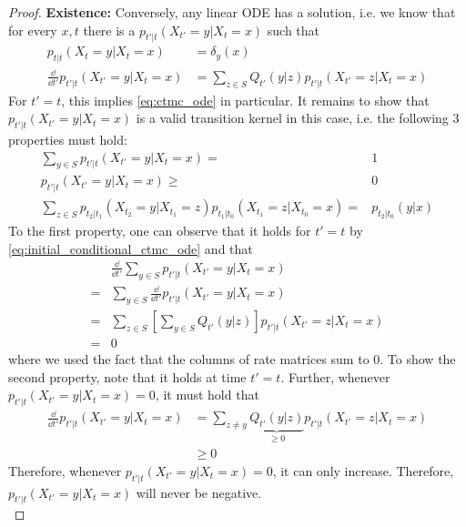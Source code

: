 \begin{proof}
\textbf{Existence: }Conversely, any linear ODE has a solution, i.e. we know that for every $x,t$ there is a $p_{t'|t}(X_{t'}=y|X_{t}=x)$ such that 
\begin{align}
\label{eq:initial_conditional_ctmc_ode}
    p_{t|t}(X_{t}=y|X_{t}=x)&=\delta_{y}(x)\\
\frac{\dd}{\dd t'}p_{t'|t}(X_{t'}=y|X_{t}=x)&=\sum\limits_{z\in S}Q_{t'}(y|z)p_{t'|t}(X_{t'}=z|X_t=x)
\end{align}
For $t'=t$, this implies \cref{eq:ctmc_ode} in particular. It remains to show that $p_{t'|t}(X_{t'}=y|X_{t}=x)$ is a valid transition kernel in this case, i.e. the following 3 properties must hold:
\begin{align}
    \sum\limits_{y\in S}p_{t'|t}(X_{t'}=y|X_{t}=x)=&1\\
    p_{t'|t}(X_{t'}=y|X_{t}=x)\geq& 0\\
    \sum\limits_{z\in S}p_{t_{2}|t_{1}}(X_{t_2}=y|X_{t_1}=z)p_{t_1|t_0}(X_{t_1}=z|X_{t_0}=x)=&p_{t_2|t_0}(y|x)
\end{align}
To the first property, one can observe that it holds for $t'=t$ by \cref{eq:initial_conditional_ctmc_ode} and that 
\begin{align}
&\frac{\dd}{\dd t'}\sum\limits_{y\in S}p_{t'|t}(X_{t'}=y|X_{t}=x)\\
=&\sum\limits_{y\in S}\frac{\dd}{\dd t'}p_{t'|t}(X_{t'}=y|X_{t}=x)\\
=&\sum\limits_{z\in S}\left[\sum\limits_{y\in S}Q_{t'}(y|z)\right]p_{t'|t}(X_{t'}=z|X_t=x)\\
=&0
\end{align}
where we used the fact that the columns of rate matrices sum to $0$. To show the second property, note that it holds at time $t'=t$. Further, whenever $p_{t'|t}(X_{t'}=y|X_{t}=x)=0$, it must hold that 
\begin{align*}
\frac{\dd}{\dd t'}p_{t'|t}(X_{t'}=y|X_{t}=x)&=\sum\limits_{z\neq y}\underbrace{Q_{t'}(y|z)}_{\geq 0}p_{t'|t}(X_{t'}=z|X_t=x)\\
&\geq 0
\end{align*}
Therefore, whenever $p_{t'|t}(X_{t'}=y|X_{t}=x)=0$, it can only increase. Therefore, $p_{t'|t}(X_{t'}=y|X_{t}=x)$ will never be negative.\\


\end{proof}

